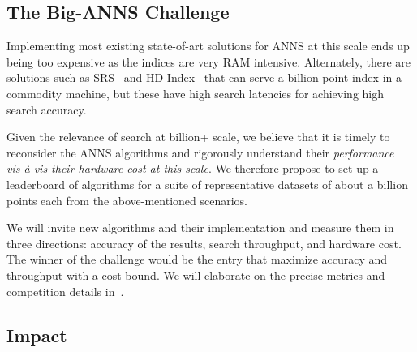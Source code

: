 \subsection{The Big-ANNS Challenge} 
Implementing most existing state-of-art solutions for ANNS at this
scale ends up being too expensive as the indices are very RAM
intensive. Alternately, there are solutions such as SRS~\cite{Sun14}
and HD-Index~\cite{Arora18} that can serve a billion-point index in a
commodity machine, but these have high search latencies for achieving
high search accuracy.

Given the relevance of search at billion+ scale, we believe that
it is timely to reconsider the ANNS algorithms and rigorously understand their \emph{performance
vis-\`a-vis their hardware cost at this scale}. We therefore propose to
set up a leaderboard of algorithms for a suite of representative
datasets of about a billion points each from the above-mentioned scenarios.

We will invite new algorithms and their implementation and measure
them in three directions: accuracy of the results, search throughput,
and hardware cost.  The winner of the challenge would be the entry
that maximize accuracy and throughput with a cost bound.  We will
elaborate on the precise metrics and competition details
in~.
 


\subsection{Impact}


